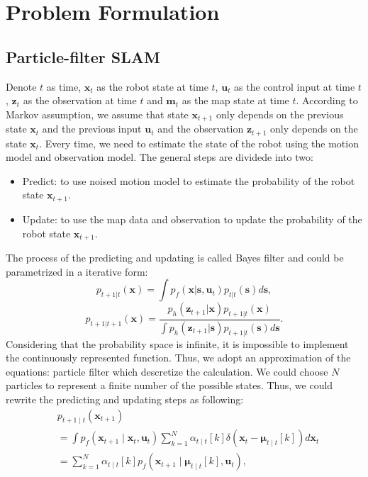 \documentclass[conference]{IEEEtran}
\begin{document}
\section{Problem Formulation}
\subsection{Particle-filter SLAM}
Denote $t$ as time, $\boldsymbol{x}_t$ as the robot state at time $t$, $\boldsymbol{u}_t$ as the control input at time $t$,
$\boldsymbol{z}_t$ as the observation at time $t$ and $\boldsymbol{m}_t$ as the map state at time $t$. According to Markov 
assumption, we assume that state $\boldsymbol{x}_{t+1}$ only depends on the previous state $\boldsymbol{x}_t$ and the previous
input $\boldsymbol{u}_t$ and the observation $\boldsymbol{z}_{t+1}$ only depends on the state $\boldsymbol{x}_t$.
Every time, we need to estimate the state of the robot using the motion model and observation model. The general steps are 
dividede into two:
\begin{itemize}
    \item Predict: to use noised motion model to estimate the probability of the robot state $\boldsymbol{x}_{t+1}$.
    \item Update: to use the map data and observation to update the probability of the robot state  $\boldsymbol{x}_{t+1}$.
\end{itemize}
The process of the predicting and updating is called Bayes filter and could be parametrized in a iterative form:
\begin{equation}
    p_{t+1|t}(\boldsymbol{x}) = \int p_f(\boldsymbol{x}| \boldsymbol{s}, \boldsymbol{u}_t)p_{t|t}(\boldsymbol{s})d\boldsymbol{s},
\end{equation}
\begin{equation}
    p_{t+1|t+1}(\boldsymbol{x}) = \frac{p_h(\boldsymbol{z}_{t+1}|\boldsymbol{x})p_{t+1|t}(\boldsymbol{x})}
    {\int p_h(\boldsymbol{z}_{t+1}|\boldsymbol{s})p_{t+1|t}(\boldsymbol{s}) d\boldsymbol{s}}.
\end{equation}
Considering that the probability space is infinite, it is impossible to implement the continuously represented function. Thus,
we adopt an approximation of the equations: particle filter which descretize the calculation. We could choose $N$ particles to
represent a finite number of the possible states. Thus, we could rewrite the predicting and updating steps as following:
\begin{equation}
    \begin{aligned}
    &p_{t+1 \mid t}\left(\boldsymbol{x}_{t+1}\right)\\ & =\int p_f\left(\boldsymbol{x}_{t+1} \mid \boldsymbol{x}_t, \boldsymbol{u}_t\right) \sum_{k=1}^N \alpha_{t \mid t}[k] \delta\left(\boldsymbol{x}_t-\boldsymbol{\mu}_{t \mid t}[k]\right) d \boldsymbol{x}_t \\
    & =\sum_{k=1}^N \alpha_{t \mid t}[k] p_f\left(\boldsymbol{x}_{t+1} \mid \boldsymbol{\mu}_{t \mid t}[k], \boldsymbol{u}_t\right),
    \end{aligned}
\end{equation}
\end{document}
